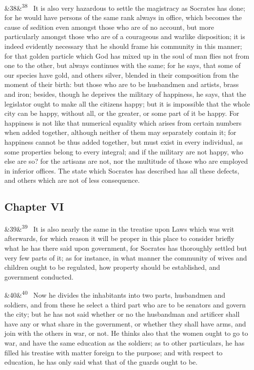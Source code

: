 \documentclass[12pt]{article}
\newcommand{\para}[1][]{\par\noindent\ifx&#1&\else\textsuperscript{\footnotesize #1}~\fi}
\begin{document}
\para[38] It is also very hazardous to settle the magistracy as Socrates has done; for he would have persons of the same rank always in office, which becomes the cause of sedition even amongst those who are of no account, but more particularly amongst those who are of a courageous and warlike disposition; it is indeed evidently necessary that he should frame his community in this manner; for that golden particle which God has mixed up in the soul of man flies not from one to the other, but always continues with the same; for he says, that some of our species have gold, and others silver, blended in their composition from the moment of their birth: but those who are to be husbandmen and artists, brass and iron; besides, though he deprives the military of happiness, he says, that the legislator ought to make all the citizens happy; but it is impossible that the whole city can be happy, without all, or the greater, or some part of it be happy. For happiness is not like that numerical equality which arises from certain numbers when added together, although neither of them may separately contain it; for happiness cannot be thus added together, but must exist in every individual, as some properties belong to every integral; and if the military are not happy, who else are so? for the artisans are not, nor the multitude of those who are employed in inferior offices. The state which Socrates has described has all these defects, and others which are not of less consequence.

\subsection*{Chapter VI}

\para[39] It is also nearly the same in the treatise upon Laws which was writ afterwards, for which reason it will be proper in this place to consider briefly what he has there said upon government, for Socrates has thoroughly settled but very few parts of it; as for instance, in what manner the community of wives and children ought to be regulated, how property should be established, and government conducted.

\para[40] Now he divides the inhabitants into two parts, husbandmen and soldiers, and from these he select a third part who are to be senators and govern the city; but he has not said whether or no the husbandman and artificer shall have any or what share in the government, or whether they shall have arms, and join with the others in war, or not. He thinks also that the women ought to go to war, and have the same education as the soldiers; as to other particulars, he has filled his treatise with matter foreign to the purpose; and with respect to education, he has only said what that of the guards ought to be.
\end{document}
